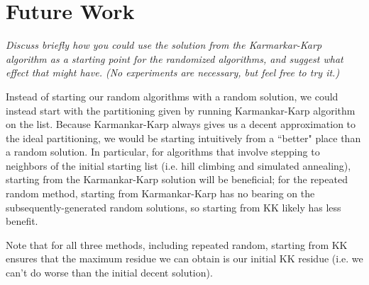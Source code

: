\documentclass[a4paper]{article}
\begin{document}
	

	
	\section{Future Work}
	\textit{Discuss briefly how you could use the solution from the Karmarkar-Karp algorithm as a starting point for the randomized algorithms, and suggest what effect that might have. (No experiments are necessary, but feel free to try it.)}
	
	Instead of starting our random algorithms with a random solution, we could instead start with the partitioning given by running Karmankar-Karp algorithm on the list. Because Karmankar-Karp always gives us a decent approximation to the ideal partitioning, we would be starting intuitively from a ``better" place than a random solution. In particular, for algorithms that involve stepping to neighbors of the initial starting list (i.e. hill climbing and simulated annealing), starting from the Karmankar-Karp solution will be beneficial; for the repeated random method, starting from Karmankar-Karp has no bearing on the subsequently-generated random solutions, so starting from KK likely has less benefit.
	
	Note that for all three methods, including repeated random, starting from KK ensures that the maximum residue we can obtain is our initial KK residue (i.e. we can't do worse than the initial decent solution).
	
\end{document}
